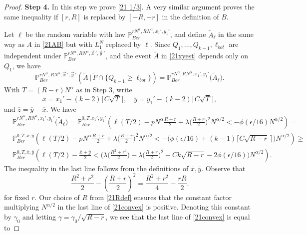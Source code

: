 \begin{proof}
		\noindent\textbf{Step 4.} In this step we prove \eqref{21 1/3}. A very similar argument proves the same inequality if $[r,R]$ is replaced by $[-R,-r]$ in the definition of $B$. 
		
		Let $\ell$ be the random variable with law $\mathbb{P}^{rN^\alpha,RN^\alpha,x_1',y_1'}_{Ber}$, and define $\tilde{A}_\ell$ in the same way as $A$ in \eqref{21AB} but with $L_1^N$ replaced by $\ell$. Since $Q_1,\dots,Q_{k-1},\ell_{bot}$ are independent under $\mathbb{P}^{rN^\alpha, RN^\alpha,\vec{x}\,',\vec{y}\,'}_{Ber}$, and the event $\tilde A$ in \eqref{21xyest} depends only on $Q_1$, we have
		\begin{equation}\label{21indep}
		\mathbb{P}^{rN^\alpha, RN^\alpha,\vec{x}\,',\vec{y}\,'}_{Ber}\left(\tilde A\,\big|\,\tilde F\cap \{ Q_{k-1} \geq \ell_{bot}\}\right) = \mathbb{P}^{rN^\alpha, RN^\alpha,x_1',y_1'}_{Ber}\big(\tilde{A}_\ell\big).
		\end{equation} 
		With $T=(R-r)N^\alpha$ as in Step 3, write
		\[
		\overline{x} = x_1' - (k-2)\lceil C\sqrt{T}\rceil, \quad \overline{y} = y_1' - (k-2)\lceil C\sqrt{T}\rceil,
		\] 
		and $\overline{z} = \overline{y}-\overline{x}$. We have
		\begin{equation} \label{21convex}
		\begin{split}
		& \mathbb{P}^{rN^\alpha, RN^\alpha,x_1',y_1'}_{Ber} \big(\tilde A_\ell\big)
		= \mathbb{P}^{0,T,x_1',y_1'}_{Ber} \left(\ell(T/2) - pN^\alpha \frac{R+r}{2} + \lambda\Big(\frac{R+r}{2}\Big)^2 N^{\alpha/2} < -\phi(\epsilon/16)N^{\alpha/2}\right) =\\
		& \mathbb{P}^{0,T,\overline{x},\overline{y}}_{Ber}\left(\ell(T/2) - pN^\alpha\frac{R+r}{2} + \lambda\Big(\frac{R+r}{2}\Big)^2 N^{\alpha/2} < -\big(\phi(\epsilon/16) + (k-1)\lceil C\sqrt{R-r}\,\rceil\big)N^{\alpha/2}\right) \geq\\
		& \mathbb{P}^{0,T,\overline{x},\overline{y}}_{Ber}\left(\ell(T/2) - \frac{\overline{x} + \overline{y}}{2} < \Big( \lambda\Big(\frac{R^2+r^2}{2}\Big) - \lambda\Big(\frac{R+r}{2}\Big)^2 - Ck\sqrt{R-r} - 2\phi(\epsilon/16)\Big)N^{\alpha/2}\right).
		\end{split}
		\end{equation}
		The inequality in the last line follows from the definitions of $\overline{x},\overline{y}$. Observe that
		\[
		\frac{R^2+r^2}{2} - \left(\frac{R+r}{2}\right)^2 = \frac{R^2 + r^2}{4} - \frac{rR}{2}.
		\]
		for fixed $r$. Our choice of $R$ from \eqref{21Rdef} ensures that the constant factor multiplying $N^{\alpha/2}$ in the last line of \eqref{21convex} is positive. Denoting this constant by $\gamma_0$ and letting $\gamma = \gamma_0/\sqrt{R-r}$, we see that the last line of \eqref{21convex} is equal to

\end{proof}

